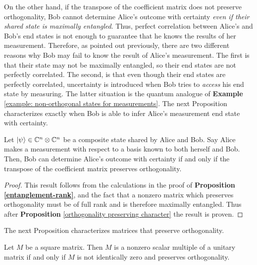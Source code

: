 On the other hand, if the transpose of the coefficient matrix does not preserve orthogonality, Bob cannot determine Alice's outcome with certainty {\emph{even if their shared state is maximally entangled}}.  Thus, perfect correlation between Alice's and Bob's end states is not enough to guarantee that he knows the results of her measurement.  Therefore, as pointed out previously, there are two different reasons why  Bob may fail to know the result of Alice's measurement.  The first is that their state may not be maximally entangled, so their end states are not perfectly correlated.  The second, is that even though their end states are perfectly correlated, uncertainty is introduced when Bob tries to {\emph{access}} his end state by measuring.  The latter situation is the quantum analogue of {\bf{Example}} \ref{example: non-orthogonal states for measurements}.  The next Proposition characterizes exactly when Bob is able to infer Alice's measurement end state with certainty.

\begin{prop} \label{prop: ultimate}
Let $\ket{\psi} \in \mathbb{C}^n \otimes \mathbb{C}^{n}$ be a composite state shared by Alice and Bob. Say Alice makes a measurement with respect to a basis known to both herself and Bob.  Then, Bob can determine Alice's outcome with certainty if and only if the transpose of the coefficient matrix preserves orthogonality.
\end{prop}

\begin{proof}
This result follows from the calculations in the proof of \textbf{Proposition \ref{entanglement-rank}}, and the fact that a nonzero matrix which preserves orthogonality must be of full rank and is therefore maximally entangled.  Thus after {\bf{Proposition}} \ref{orthogonality preserving character} the result is proven.
\end{proof}
The next Proposition characterizes matrices that preserve orthogonality.



\begin{prop} \label{orthogonality preserving character}
Let $M$ be a square matrix.  Then $M$ is a nonzero scalar multiple of a unitary matrix if and only if $M$ is not identically zero and preserves orthogonality.

\end{prop}

